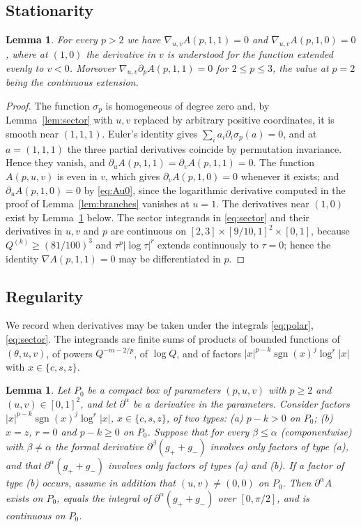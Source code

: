 \documentclass[11pt]{amsart}
\newtheorem{lemma}[theorem]{Lemma}
\theoremstyle{definition}
\theoremstyle{remark}
\numberwithin{equation}{section}
\newcommand{\sgn}{\operatorname{sgn}}
\begin{document}
\subsection{Stationarity}

\begin{lemma}\label{lem:stationary}
For every $p>2$ we have $\nabla_{u,v}A(p,1,1)=0$ and $\nabla_{u,v}A(p,1,0)=0$, where at $(1,0)$ the derivative in $v$ is understood for the function extended evenly to $v<0$. Moreover $\nabla_{u,v}\partial_pA(p,1,1)=0$ for $2\le p\le 3$, the value at $p=2$ being the continuous extension.
\end{lemma}

\begin{proof}
The function $\sigma_p$ is homogeneous of degree zero and, by Lemma~\ref{lem:sector} with $u,v$ replaced by arbitrary positive coordinates, it is smooth near $(1,1,1)$. Euler's identity gives $\sum_ia_i\partial_i\sigma_p(a)=0$, and at $a=(1,1,1)$ the three partial derivatives coincide by permutation invariance. Hence they vanish, and $\partial_uA(p,1,1)=\partial_vA(p,1,1)=0$. The function $A(p,u,v)$ is even in $v$, which gives $\partial_vA(p,1,0)=0$ whenever it exists; and $\partial_uA(p,1,0)=0$ by \eqref{eq:Au0}, since the logarithmic derivative computed in the proof of Lemma~\ref{lem:branches} vanishes at $u=1$. The derivatives near $(1,0)$ exist by Lemma~\ref{lem:regularity} below. The sector integrands in \eqref{eq:sector} and their derivatives in $u,v$ and $p$ are continuous on $[2,3]\times[9/10,1]^2\times[0,1]$, because $Q^{(k)}\ge (81/100)^3$ and $\tau^p|\log\tau|^r$ extends continuously to $\tau=0$; hence the identity $\nabla A(p,1,1)=0$ may be differentiated in $p$.
\end{proof}

\subsection{Regularity}

We record when derivatives may be taken under the integrals \eqref{eq:polar}, \eqref{eq:sector}. The integrands are finite sums of products of bounded functions of $(\theta,u,v)$, of powers $Q^{-m-2/p}$, of $\log Q$, and of factors $|x|^{p-k}\sgn(x)^j\log^r|x|$ with $x\in\{c,s,z\}$.

\begin{lemma}\label{lem:regularity}
Let $P_0$ be a compact box of parameters $(p,u,v)$ with $p\ge2$ and $(u,v)\in[0,1]^2$, and let $\partial^\alpha$ be a derivative in the parameters. Consider factors $|x|^{p-k}\sgn(x)^j\log^r|x|$, $x\in\{c,s,z\}$, of two types: \textup{(a)} $p-k>0$ on $P_0$; \textup{(b)} $x=z$, $r=0$ and $p-k\ge0$ on $P_0$. Suppose that for every $\beta\le\alpha$ (componentwise) with $\beta\ne\alpha$ the formal derivative $\partial^\beta(g_++g_-)$ involves only factors of type \textup{(a)}, and that $\partial^\alpha(g_++g_-)$ involves only factors of types \textup{(a)} and \textup{(b)}. If a factor of type \textup{(b)} occurs, assume in addition that $(u,v)\ne(0,0)$ on $P_0$. Then $\partial^\alpha A$ exists on $P_0$, equals the integral of $\partial^\alpha(g_++g_-)$ over $[0,\pi/2]$, and is continuous on $P_0$.
\end{lemma}
\end{document}

